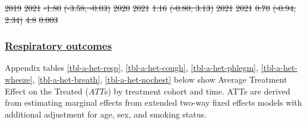 \documentclass[
  letterpaper,
  DIV=11,
  numbers=noendperiod]{scrartcl}
\providecommand{\DIFadd}[1]{{\protect\color{blue}\underline{#1}}} %
\providecommand{\DIFdel}[1]{{\protect\color{red}\sout{#1}}}                      %
\providecommand{\DIFaddbegin}{} %
\providecommand{\DIFaddend}{} %
\providecommand{\DIFdelbegin}{} %
\providecommand{\DIFdelend}{} %
\providecommand{\DIFdelFL}[1]{\DIFdel{#1}} %
\newcommand{\DIFscaledelfig}{0.5}
\newlength{\DIFdelgraphicswidth} %
\newlength{\DIFdelgraphicsheight} %
\newcommand{\DIFaddincludegraphics}[2][]{{\color{blue}\fbox{\DIFOincludegraphics[#1]{#2}}}} %
\newcommand{\DIFdelincludegraphics}[2][]{%
\sbox{\DIFdelgraphicsbox}{\DIFOincludegraphics[#1]{#2}}%
\settoboxwidth{\DIFdelgraphicswidth}{\DIFdelgraphicsbox} %
\settoboxtotalheight{\DIFdelgraphicsheight}{\DIFdelgraphicsbox} %
\scalebox{\DIFscaledelfig}{%
\parbox[b]{\DIFdelgraphicswidth}{\usebox{\DIFdelgraphicsbox}\\[-\baselineskip] \rule{\DIFdelgraphicswidth}{0em}}\llap{\resizebox{\DIFdelgraphicswidth}{\DIFdelgraphicsheight}{%
\setlength{\unitlength}{\DIFdelgraphicswidth}%
\begin{picture}(1,1)%
\thicklines\linethickness{2pt} %
{\color[rgb]{1,0,0}\put(0,0){\framebox(1,1){}}}%
{\color[rgb]{1,0,0}\put(0,0){\line( 1,1){1}}}%
{\color[rgb]{1,0,0}\put(0,1){\line(1,-1){1}}}%
\end{picture}%
}\hspace*{3pt}}} %
} %
\DeclareRobustCommand{\DIFaddbegin}{\DIFOaddbegin \let\includegraphics\DIFaddincludegraphics} %
\DeclareRobustCommand{\DIFaddend}{\DIFOaddend \let\includegraphics\DIFOincludegraphics} %
\DeclareRobustCommand{\DIFdelbegin}{\DIFOdelbegin \let\includegraphics\DIFdelincludegraphics} %
\DeclareRobustCommand{\DIFdelend}{\DIFOaddend \let\includegraphics\DIFOincludegraphics} %
\begin{document}
\DIFdelFL{\hspace{1em}2019 }%
\DIFdelFL{2021 }%
\DIFdelFL{-1.80 }%
\DIFdelFL{(-3.58, -0.03) }%
\DIFdelFL{\hspace{1em}2020 }%
\DIFdelFL{2021 }%
\DIFdelFL{1.16 }%
\DIFdelFL{(-0.80, 3.13) }%
\DIFdelFL{\hspace{1em}2021 }%
\DIFdelFL{2021 }%
\DIFdelFL{0.70 }%
\DIFdelFL{(-0.94, 2.34) }%
\DIFdelFL{4.8 }%
\DIFdelFL{0.003}%

\DIFdelend \newpage

\DIFdelbegin %
\DIFdelend \DIFaddbegin \subsubsection{\DIFadd{Respiratory outcomes}}\label{respiratory-outcomes}
\DIFaddend 

Appendix tables \ref{tbl-a-het-resp}, \ref{tbl-a-het-cough},
\ref{tbl-a-het-phlegm}, \ref{tbl-a-het-wheeze}, \ref{tbl-a-het-breath},
\ref{tbl-a-het-nochest} below show Average Treatment Effect on the
Treated (\(ATT\)s) by treatment cohort and time. ATTs are derived from
estimating marginal effects from extended two-way fixed effects models
with additional adjustment for age, sex, and smoking status.
\end{document}
